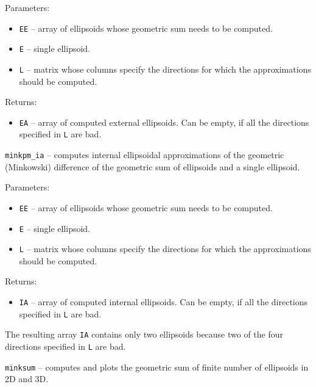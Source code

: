 Parameters:
\begin{itemize}
\item {\tt EE} -- array of ellipsoids whose geometric sum needs to be computed.
\item {\tt E} -- single ellipsoid.
\item {\tt L} -- matrix whose columns specify the directions for which
the approximations should be computed.
\end{itemize}

Returns:
\begin{itemize}
\item {\tt EA} -- array of computed external ellipsoids. Can be empty, if
all the directions specified in {\tt L} are bad.
\end{itemize}



\newpage

{\Large {\tt minkpm\_ia}} -- computes internal ellipsoidal approximations
of the geometric (Minkowski) difference of the geometric sum of ellipsoids
and a single ellipsoid.

Parameters:
\begin{itemize}
\item {\tt EE} -- array of ellipsoids whose geometric sum needs to be computed.
\item {\tt E} -- single ellipsoid.
\item {\tt L} -- matrix whose columns specify the directions for which
the approximations should be computed.
\end{itemize}

Returns:
\begin{itemize}
\item {\tt IA} -- array of computed internal ellipsoids. Can be empty, if
all the directions specified in {\tt L} are bad.
\end{itemize}


The resulting array {\tt IA} contains only two ellipsoids because two
of the four directions specified in {\tt L} are bad.

\newpage

{\Large {\tt minksum}} -- computes and plots the geometric sum of finite
number of ellipsoids in 2D and 3D.

